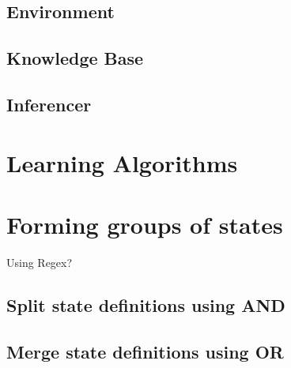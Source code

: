 \subsection{Environment}

\subsection{Knowledge Base}

\subsection{Inferencer}

\section{Learning Algorithms} 

\section{Forming groups of states}
Using Regex?



\subsection{Split state definitions using AND}


\subsection{Merge state definitions using OR}

